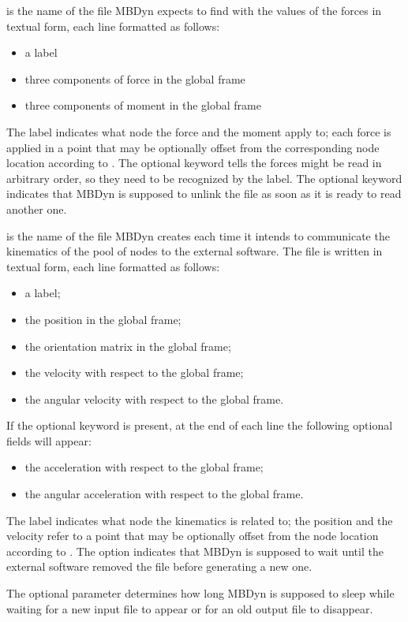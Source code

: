  is the name of the file MBDyn expects to find
with the values of the forces in textual form, each line formatted as follows:
\begin{itemize}
\item a label
\item three components of force in the global frame
\item three components of moment in the global frame
\end{itemize}
The label indicates what node the force and the moment apply to; 
each force is applied in a point that may be optionally offset 
from the corresponding node location according to .
The optional keyword  tells the forces might be
read in arbitrary order, so they need to be recognized by the label.
The optional keyword  indicates that MBDyn is supposed
to unlink the file as soon as it is ready to read another one.

 is the name of the file MBDyn creates
each time it intends to communicate the kinematics of the pool of nodes
to the external software.
The file is written in textual form, each line formatted as follows:
\begin{itemize}
\item a label;
\item the position in the global frame;
\item the orientation matrix in the global frame;
\item the velocity with respect to the global frame;
\item the angular velocity with respect to the global frame.
\end{itemize}
If the optional keyword  is present,
at the end of each line the following optional fields will appear:
\begin{itemize}
\item the acceleration with respect to the global frame;
\item the angular acceleration with respect to the global frame.
\end{itemize}
The label indicates what node the kinematics is related to;
the position and the velocity refer to a point that may be optionally
offset from the node location according to .
The option  indicates that MBDyn is supposed to wait
until the external software removed the file before generating a new one.

The optional parameter  determines how long MBDyn
is supposed to sleep while waiting for a new input file to appear
or for an old output file to disappear.

